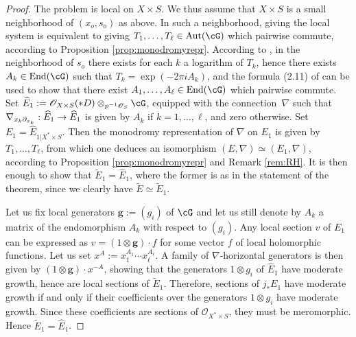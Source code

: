 \documentclass[english]{smfart}
\numberwithin{subsection}{section}
\def\sho{\mathcal{O}}\let\cO\sho
\newcommand{\bg}{\boldsymbol{g}}
\newcommand{\XS}{X\times S}
\newcommand{\XsS}{X^*\times S}
\let\wt\widetilde
\let\wh\widehat
\newcommand{\pOS}{p^{-1}\sho_S}
\DeclareMathOperator{\Aut}{Aut}
\DeclareMathOperator{\End}{End}
\numberwithin{equation}{section}
\theoremstyle{plain}
\theoremstyle{definition}
\def\to{\mathchoice{\longrightarrow}{\rightarrow}{\rightarrow}{\rightarrow}}
\begin{document}
\begin{proof}
The problem is local on $\XS$. We thus assume that $\XS$ is a small neighborhood of $(x_o,s_o)$ as above. In such a neighborhood, giving the local system is equivalent to giving $T_1,\dots,T_\ell \in \Aut(\cG)$ which pairwise commute, according to Proposition \ref{prop:monodromyrepr}. According to \cite[Cor.\,2.3.10 \& (3.45)]{Wang08}, in the neighborhood of $s_o$ there exists for each $k$ a logarithm of $T_k$, hence there exists $A_k\in\End(\cG)$ such that $T_k=\exp(-2\pi i A_k)$, and the formula (2.11) of \cite{Wang08} can be used to show that there exist $A_1,\dots,A_\ell\in\End(\cG)$ which pairwise commute. Set $\wh E_1:=\cO_{\XS}(*D)\otimes_{\pOS}\cG$, equipped with the connection~$\nabla$ such that $\nabla_{x_k\partial_{x_k}}:\wh E_1\to\wh E_1$ is given by $A_k$ if $k=1,\dots,\ell$, and zero otherwise. Set $E_1=\wh E_{1|\XsS}$. Then the monodromy representation of $\nabla$ on $E_1$ is given by $T_1,\dots,T_\ell$, from which one deduces an isomorphism $(E,\nabla)\simeq(E_1,\nabla)$, according to Proposition \ref{prop:monodromyrepr} and Remark \ref{rem:RH}. It is then enough to show that $\wt E_1=\wh E_1$, where the former is as in the statement of the theorem, since we clearly have $\wt E\simeq\wt E_1$.

Let us fix local generators $\bg:=(g_i)$ of $\cG$ and let us still denote by $A_k$ a matrix of the endomorphism $A_k$ with respect to $(g_i)$. Any local section $v$ of $E_1$ can be expressed as $v=(1\otimes\bg)\cdot f$ for some vector $f$ of local holomorphic functions. Let us set $x^A:=x_1^{A_1}\cdots x_\ell^{A_\ell}$. A family of $\nabla$-horizontal generators is then given by $(1\otimes\bg)\cdot x^{-A}$, showing that the generators $1\otimes g_i$ of $\wh E_1$ have moderate growth, hence are local sections of $\wt E_1$. Therefore, sections of $j_*E_1$ have moderate growth if and only if their coefficients over the generators $1\otimes g_i$ have moderate growth. Since these coefficients are sections of $\cO_{\XsS}$, they must be meromorphic. Hence $\wt E_1=\wh E_1$.
\end{proof}
\end{document}

